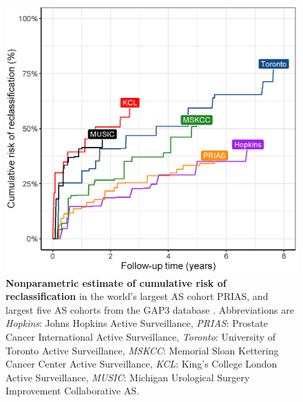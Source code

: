 \begin{figure}
\centerline{\includegraphics[width=\columnwidth]{images/npmle_plot.eps}}
\caption{\textbf{Nonparametric estimate \citep{turnbull1976empirical} of cumulative risk of reclassification} in the world's largest AS cohort PRIAS, and largest five AS cohorts from the GAP3 database \citep{gap3_2018}. Abbreviations are \textit{Hopkins}: Johns Hopkins Active Surveillance, \textit{PRIAS}: Prostate Cancer International Active Surveillance, \textit{Toronto}: University of Toronto Active Surveillance, \textit{MSKCC}: Memorial Sloan Kettering Cancer Center Active Surveillance, \textit{KCL}: King's College London Active Surveillance, \textit{MUSIC}: Michigan Urological Surgery Improvement Collaborative AS.}
\label{fig:npmle_plot}
\end{figure}

